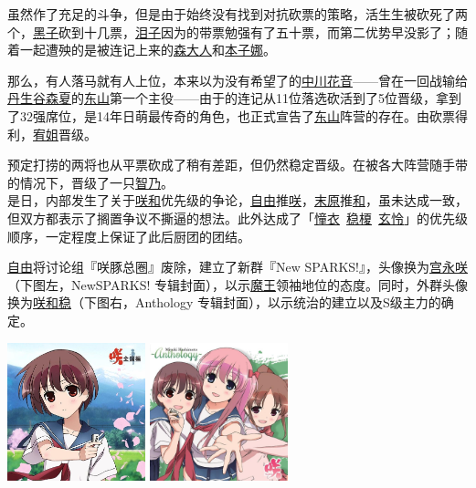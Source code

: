 虽然作了充足的斗争，但是由于始终没有找到对抗砍票的策略，活生生被砍死了两个，\uline{黑子}砍到十几票，\uline{泪子}因为的带票勉强有了五十票，而第二优势早没影了；随着一起遭殃的是被连记上来的\uline{森大人}和\uline{本子娜}。

那么，有人落马就有人上位，本来以为没有希望了的\uline{中川花音}——曾在一回战输给\uline{丹生谷森夏}的\uline{东山}第一个主役——由于的连记从11位落选砍活到了5位晋级，拿到了32强席位，是14年日萌最传奇的角色，也正式宣告了\uline{东山}阵营的存在。由砍票得利，\uline{宥姐}晋级。

预定打捞的两将也从平票砍成了稍有差距，但仍然稳定晋级。在被各大阵营随手带的情况下，晋级了一只\uline{智乃}。
\\[1em]

是日，内部发生了关于\uline{咲}\uline{和}优先级的争论，\uline{自由}推\uline{咲}，\uline{末原}推\uline{和}，虽未达成一致，但双方都表示了搁置争议不撕逼的想法。此外达成了「\uline{憧衣}~\uline{稳榎}~\uline{玄怜}」的优先级顺序，一定程度上保证了此后厨团的团结。

\uline{自由}将讨论组『咲豚总圈』废除，建立了新群『New SPARKS!』，头像换为\uline{宫永咲}（下图左，NewSPARKS! 专辑封面），以示\uline{魔王}领袖地位的态度。同时，外群头像换为\uline{咲}\uline{和}\uline{稳}（下图右，Anthology 专辑封面），以示统治的建立以及S级主力的确定。

\begin{center}
\includegraphics[width=0.3\textwidth]{images/NewSPARKS.jpg}
\quad\quad\quad\quad
\includegraphics[width=0.3\textwidth]{images/Anthology.jpg}
\end{center}

